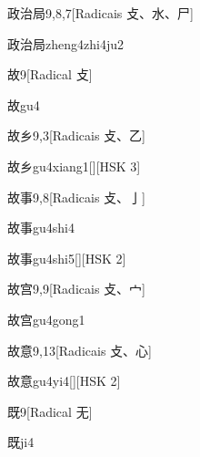 \begin{entry}{政治局}{9,8,7}[Radicais ⽁、⽔、⼫]
  \begin{phonetics}{政治局}{zheng4zhi4ju2}
  \end{phonetics}
\end{entry}

\begin{entry}{故}{9}[Radical ⽁]
  \begin{phonetics}{故}{gu4}
  \end{phonetics}
\end{entry}

\begin{entry}{故乡}{9,3}[Radicais ⽁、⼄]
  \begin{phonetics}{故乡}{gu4xiang1}[][HSK 3]
  \end{phonetics}
\end{entry}

\begin{entry}{故事}{9,8}[Radicais ⽁、⼅]
  \begin{phonetics}{故事}{gu4shi4}
  \end{phonetics}
  \begin{phonetics}{故事}{gu4shi5}[][HSK 2]
  \end{phonetics}
\end{entry}

\begin{entry}{故宫}{9,9}[Radicais ⽁、⼧]
  \begin{phonetics}{故宫}{gu4gong1}
  \end{phonetics}
\end{entry}

\begin{entry}{故意}{9,13}[Radicais ⽁、⼼]
  \begin{phonetics}{故意}{gu4yi4}[][HSK 2]
  \end{phonetics}
\end{entry}

\begin{entry}{既}{9}[Radical ⽆]
  \begin{phonetics}{既}{ji4}
  \end{phonetics}
\end{entry}

